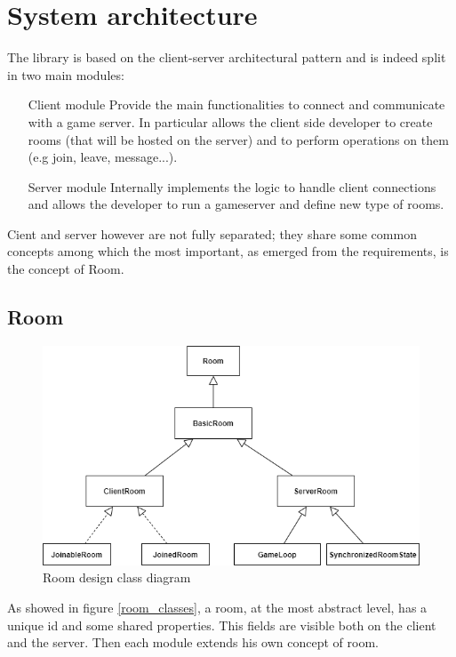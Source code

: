 \chapter{System architecture}
The library is based on the client-server architectural pattern and is indeed split in two main modules: 
\begin{itemize}
	\item[Client module] Provide the main functionalities to connect and communicate with a game server. In particular allows the client side developer to create rooms (that will be hosted on the server) and to perform operations on them (e.g join, leave, message...).
	\item[Server module] Internally implements the logic to handle client connections and allows the developer to run a gameserver and define new type of rooms.
\end{itemize}

Cient and server however are not fully separated; they share some common concepts among which the most important, as emerged from the requirements, is the concept of Room.

\section{Room}
\begin{figure}[H]
	\includegraphics[scale=0.7]{images/3-architecture/room-class.png}
	\caption{Room design class diagram}
	\label{fig:room_classes}
\end{figure}

As showed in figure \ref{room_classes}, a room, at the most abstract level, has a unique id and some shared properties. This fields are visible both on the client and the server. Then each module extends his own concept of room. 

